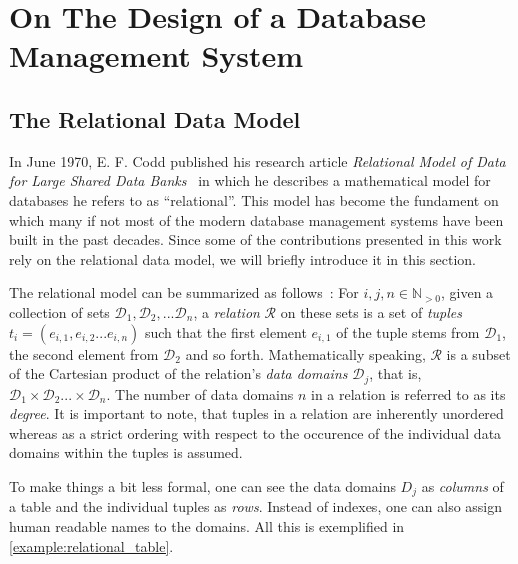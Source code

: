 \chapter{On The Design of a Database Management System}
\label{chapter:theory_databases}


\section{The Relational Data Model}
\label{section:relational_data_model}

In June 1970, E. F. Codd published his research article \emph{Relational Model of Data for Large Shared Data Banks}~\cite{Codd:1970Relational} in which he describes a mathematical model for databases he refers to as ``relational''. This model has become the fundament on which many if not most of the modern database management systems have been built in the past decades. Since some of the contributions presented in this work rely on the relational data model, we will briefly introduce it in this section.

The relational model can be summarized as follows~\cite{Codd:1970Relational,Codd:1990Relational}: For $i,j,n \in \mathbb{N}_{> 0}$, given a collection of sets $\mathcal{D}_1, \mathcal{D}_2, ... \mathcal{D}_n$, a \emph{relation} $\mathcal{R}$ on these sets is a set of \emph{tuples} $t_i = (e_{i,1}, e_{i,2} ... e_{i,n})$ such that the first element $e_{i,1}$ of the tuple stems from $\mathcal{D}_1$, the second element from $\mathcal{D}_2$ and so forth. Mathematically speaking, $\mathcal{R}$ is a subset of the Cartesian product of the relation's \emph{data domains} $\mathcal{D}_j$, that is, $\mathcal{D}_1 \times \mathcal{D}_2 ... \times \mathcal{D}_n$. The number of data domains $n$ in a relation is referred to as its \emph{degree}. It is important to note, that tuples in a relation are inherently unordered whereas as a strict ordering with respect to the occurence of the individual data domains within the tuples is assumed.

To make things a bit less formal, one can see the data domains $D_j$ as \emph{columns} of a table and the individual tuples as \emph{rows}. Instead of indexes, one can also assign human readable names to the domains. All this is exemplified in \cref{example:relational_table}. 

